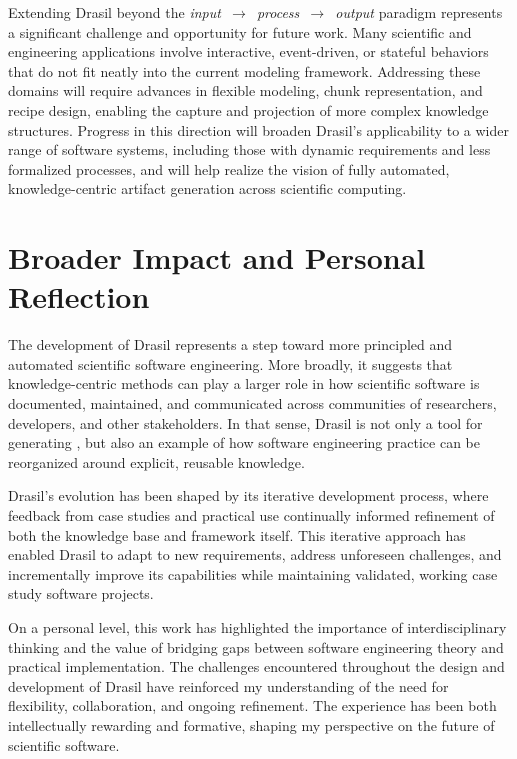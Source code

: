 Extending Drasil beyond the 
\mbox{\emph{input~$\rightarrow$~process~$\rightarrow$~output}} paradigm 
represents a significant challenge and opportunity for future 
work. Many scientific and engineering applications involve interactive, 
event-driven, or stateful behaviors that do not fit neatly into the current 
modeling framework. Addressing these domains will require advances in flexible
modeling, chunk representation, and recipe design, enabling the capture
and projection of more complex knowledge structures. Progress in this
direction will broaden Drasil's applicability to a wider range of
software systems, including those with dynamic requirements and less
formalized processes, and will help realize the vision of fully
automated, knowledge-centric artifact generation across scientific
computing.

\section{Broader Impact and Personal Reflection}

The development of Drasil represents a step toward more principled and
automated scientific software engineering. More broadly, it suggests that
knowledge-centric methods can play a larger role in how scientific software is
documented, maintained, and communicated across communities of researchers,
developers, and other stakeholders. In that sense, Drasil is not only a tool
for generating \sfs{}, but also an example of how software engineering
practice can be reorganized around explicit, reusable knowledge.

Drasil's evolution has been shaped by its iterative development process,
where feedback from case studies and practical use continually informed
refinement of both the knowledge base and framework itself. This
iterative approach has enabled Drasil to adapt to new requirements,
address unforeseen challenges, and incrementally improve its capabilities
while maintaining validated, working case study software projects.

On a personal level, this work has highlighted the importance of
interdisciplinary thinking and the value of bridging gaps between software
engineering theory and practical implementation. The challenges encountered
throughout the design and development of Drasil have reinforced my 
understanding of the need for flexibility, collaboration, and ongoing 
refinement. The experience has been both intellectually rewarding and 
formative, shaping my perspective on the future of scientific software. 

